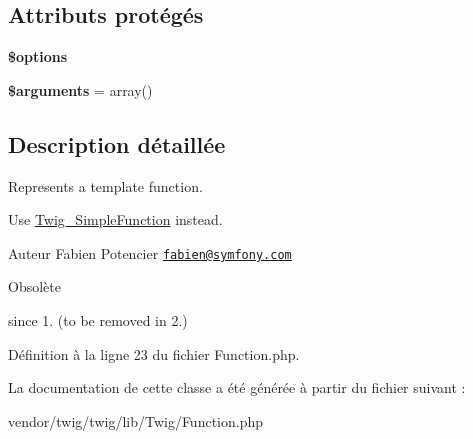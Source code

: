 \subsection*{Attributs protégés}
\begin{DoxyCompactItemize}
\item 
{\bfseries \$options}\hypertarget{class_twig___function_a011800c63ece4cbbfa77136a20607023}{}\label{class_twig___function_a011800c63ece4cbbfa77136a20607023}

\item 
{\bfseries \$arguments} = array()\hypertarget{class_twig___function_a61eded163d962fc248b3cf209000979b}{}\label{class_twig___function_a61eded163d962fc248b3cf209000979b}

\end{DoxyCompactItemize}


\subsection{Description détaillée}
Represents a template function.

Use \hyperlink{class_twig___simple_function}{Twig\+\_\+\+Simple\+Function} instead.

\begin{DoxyAuthor}{Auteur}
Fabien Potencier \href{mailto:fabien@symfony.com}{\tt fabien@symfony.\+com}
\end{DoxyAuthor}
\begin{DoxyRefDesc}{Obsolète}
\item[\hyperlink{deprecated__deprecated000026}{Obsolète}]since 1. (to be removed in 2.) \end{DoxyRefDesc}


Définition à la ligne 23 du fichier Function.\+php.



La documentation de cette classe a été générée à partir du fichier suivant \+:\begin{DoxyCompactItemize}
\item 
vendor/twig/twig/lib/\+Twig/Function.\+php\end{DoxyCompactItemize}
